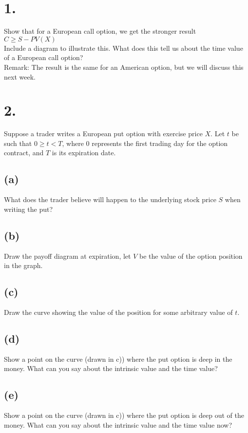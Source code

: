 \documentclass{article}
\begin{document}
\thispagestyle{firstpageheader}

\section*{1.}


{\Large 

Show that for a European call option, we get the stronger result \\
$C \geq S - PV(X) $ \\
Include a diagram to illustrate this.  What does this tell us about the time value of a European call option? \\
Remark:  The result is the same for an American option, but we will discuss this next week.



}

\section*{2.}
{\Large

Suppose a trader writes a European put option with exercise price $X$.  Let $t$ be such that $0 \geq t < T$, where 0 represents the first trading day for the option contract, and $T$ is its expiration date.

\subsection*{(a)}

What does the trader believe will happen to the underlying stock price $S$ when writing the put?

\subsection*{(b)}

Draw the payoff diagram at expiration, let $V$ be the value of the option position in the graph.

\subsection*{(c)}

Draw the curve showing the value of the position for some arbitrary value of $t$.

\subsection*{(d)}

Show a point on the curve (drawn in c)) where the put option is deep in the money.  What can you say about the intrinsic value and the time value?

\subsection*{(e)}

Show a point on the curve (drawn in c)) where the put option is deep out of the money.  What can you say about the intrinsic value and the time value now?

}
\end{document}
